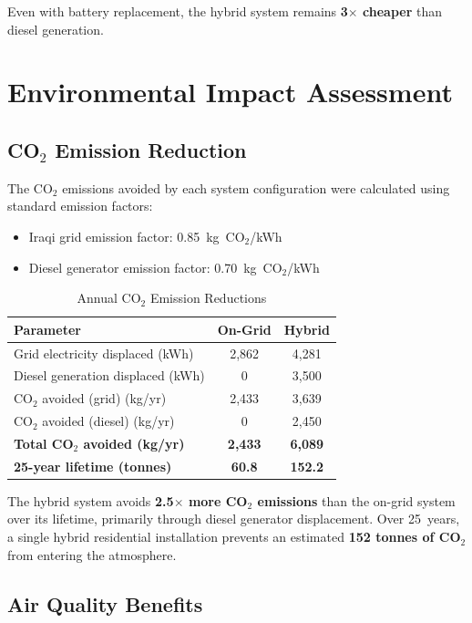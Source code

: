 Even with battery replacement, the hybrid system remains \textbf{3$\times$ cheaper} than diesel generation.


\section{Environmental Impact Assessment}

\subsection{CO$_2$ Emission Reduction}

The CO$_2$ emissions avoided by each system configuration were calculated using standard emission factors:

\begin{itemize}
    \item Iraqi grid emission factor: 0.85~kg~CO$_2$/kWh \cite{worldometers2024}
    \item Diesel generator emission factor: 0.70~kg~CO$_2$/kWh
\end{itemize}

\begin{table}[H]
\centering
\caption{Annual CO$_2$ Emission Reductions}
\label{tab:co2}
\begin{tabular}{@{}p{6cm} c c@{}}
\toprule
\textbf{Parameter} & \textbf{On-Grid} & \textbf{Hybrid} \\
\midrule
Grid electricity displaced (kWh) & 2,862 & 4,281 \\
Diesel generation displaced (kWh) & 0 & 3,500 \\
CO$_2$ avoided (grid) (kg/yr) & 2,433 & 3,639 \\
CO$_2$ avoided (diesel) (kg/yr) & 0 & 2,450 \\
\textbf{Total CO$_2$ avoided (kg/yr)} & \textbf{2,433} & \textbf{6,089} \\
\textbf{25-year lifetime (tonnes)} & \textbf{60.8} & \textbf{152.2} \\
\bottomrule
\end{tabular}
\end{table}

The hybrid system avoids \textbf{2.5$\times$ more CO$_2$ emissions} than the on-grid system over its lifetime, primarily through diesel generator displacement. Over 25~years, a single hybrid residential installation prevents an estimated \textbf{152 tonnes of CO$_2$} from entering the atmosphere.


\subsection{Air Quality Benefits}

